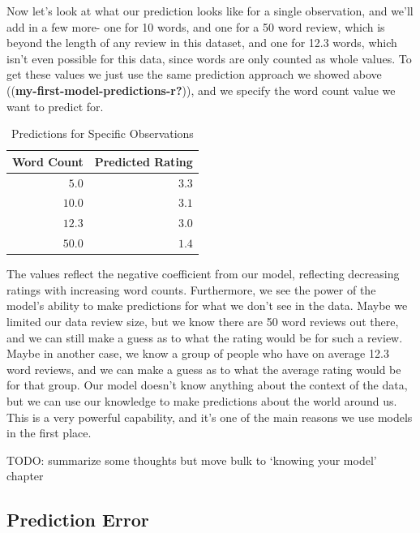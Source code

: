 \documentclass[
  letterpaper,
]{krantz}
\begin{document}
Now let's look at what our prediction looks like for a single
observation, and we'll add in a few more- one for 10 words, and one for
a 50 word review, which is beyond the length of any review in this
dataset, and one for 12.3 words, which isn't even possible for this
data, since words are only counted as whole values. To get these values
we just use the same prediction approach we showed above
((\textbf{my-first-model-predictions-r?})), and we specify the word
count value we want to predict for.

\hypertarget{tbl-predictions}{}
\begin{longtable}{rr}
\caption{\label{tbl-predictions}Predictions for Specific Observations }\tabularnewline

\toprule
Word Count & Predicted Rating \\ 
\midrule\addlinespace[2.5pt]
\textcolor[HTML]{404040}{$5.0$} & \textcolor[HTML]{404040}{$3.3$} \\ 
\textcolor[HTML]{404040}{$10.0$} & \textcolor[HTML]{404040}{$3.1$} \\ 
\textcolor[HTML]{404040}{$12.3$} & \textcolor[HTML]{404040}{$3.0$} \\ 
\textcolor[HTML]{404040}{$50.0$} & \textcolor[HTML]{404040}{$1.4$} \\ 
\bottomrule
\end{longtable}

The values reflect the negative coefficient from our model, reflecting
decreasing ratings with increasing word counts. Furthermore, we see the
power of the model's ability to make predictions for what we don't see
in the data. Maybe we limited our data review size, but we know there
are 50 word reviews out there, and we can still make a guess as to what
the rating would be for such a review. Maybe in another case, we know a
group of people who have on average 12.3 word reviews, and we can make a
guess as to what the average rating would be for that group. Our model
doesn't know anything about the context of the data, but we can use our
knowledge to make predictions about the world around us. This is a very
powerful capability, and it's one of the main reasons we use models in
the first place.

TODO: summarize some thoughts but move bulk to `knowing your model'
chapter

\subsection{Prediction Error}\label{sec-lm-prediction-error}
\end{document}
